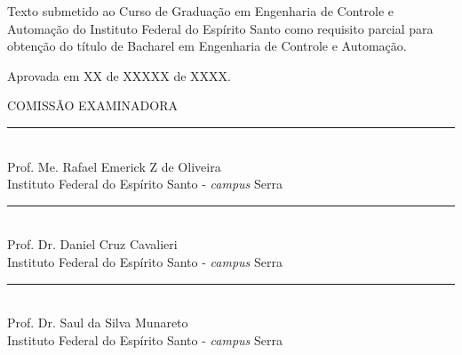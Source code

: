 {
    \center          
    {\large\MakeUppercase{\imprimirautor}}\par
    \vfill
    {\bfseries\large\MakeUppercase\imprimirtitulo}\par
    \vspace{10 mm}
    \hspace{.35\textwidth}
    \begin{minipage}{.6\textwidth}
        \SingleSpacing
        Texto submetido ao Curso de Graduação em Engenharia de Controle e Automação do Instituto Federal do Espírito Santo como requisito parcial para obtenção do título de Bacharel em Engenharia de Controle e Automação. 
    \end{minipage}
    
    \vspace{1.5cm}
    
    Aprovada em XX de XXXXX de XXXX.
    
    \vspace{0.8cm}
    
    \MakeUppercase{Comissão Examinadora}
    
    \vspace{0.8cm}
    
    \rule{12cm}{1pt} \\
    Prof. Me. Rafael Emerick Z de Oliveira \\
    Instituto Federal do Espírito Santo - \textit{campus} Serra
    
    \vspace{0.8cm}
    \rule{12cm}{1pt} \\
    Prof. Dr. Daniel Cruz Cavalieri \\
    Instituto Federal do Espírito Santo - \textit{campus} Serra
    
    \vspace{0.8cm}
    \rule{12cm}{1pt} \\
    Prof. Dr. Saul da Silva Munareto \\
    Instituto Federal do Espírito Santo - \textit{campus} Serra
    
    
    \vfill
    {\large\MakeUppercase\imprimirlocal}\par
    {\large\imprimirdata}\par
}